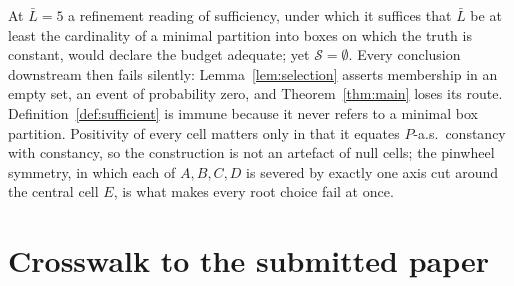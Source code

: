 \documentclass[11pt]{article}
\theoremstyle{plain}
\theoremstyle{definition}
\theoremstyle{remark}
\newcommand{\cS}{\mathcal{S}}
\begin{document}
\noindent At $\bar L=5$ a refinement reading of sufficiency, under which it
suffices that $\bar L$ be at least the cardinality of a minimal partition into
boxes on which the truth is constant, would declare the budget adequate; yet
$\cS=\emptyset$. Every conclusion downstream then fails silently:
Lemma~\ref{lem:selection} asserts membership in an empty set, an event of
probability zero, and Theorem~\ref{thm:main} loses its route.
Definition~\ref{def:sufficient} is immune because it never refers to a minimal
box partition. Positivity of every cell matters only in that it equates
$P$-a.s.\ constancy with constancy, so the construction is not an artefact of
null cells; the pinwheel symmetry, in which each of $A,B,C,D$ is severed by
exactly one axis cut around the central cell $E$, is what makes every root choice
fail at once.

\section{Crosswalk to the submitted paper}\label{app:crosswalk}
\end{document}
